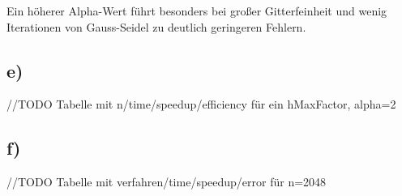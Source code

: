 \documentclass[paper = a4]{scrartcl}
\begin{document}
Ein höherer Alpha-Wert führt besonders bei großer Gitterfeinheit und wenig Iterationen von Gauss-Seidel zu deutlich geringeren Fehlern.

\subsection*{e)}
//TODO Tabelle mit n/time/speedup/efficiency für ein hMaxFactor, alpha=2

\subsection*{f)}
//TODO Tabelle mit verfahren/time/speedup/error für n=2048
\end{document}

